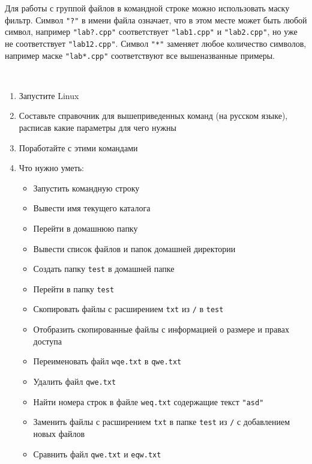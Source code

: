\documentclass[a4paper,12pt]{article}
\begin{document}
  \begin{flushleft}
    Для работы с группой файлов в командной строке можно использовать маску фильтр. Символ \texttt{"?"} в имени файла означает, что в этом месте может быть любой символ, например \texttt{"lab?.cpp"} соответствует \texttt{"lab1.cpp"} и \texttt{"lab2.cpp"}, но уже не соответствует \texttt{"lab12.cpp"}. Символ \texttt{"*"} заменяет любое количество символов, например маске \texttt{"lab*.cpp"} соответствуют все вышеназванные примеры.
  \end{flushleft}

  \newpage

  \begin{flushleft}
     \\[0.5em]
    \begin{enumerate}
      \item Запустите Linux
      \item Составьте справочник для вышеприведенных команд (на русском языке), расписав какие параметры для чего нужны
      \item Поработайте с этими командами
      \item Что нужно уметь:
      \begin{itemize}
        \item Запустить командную строку
        \item Вывести имя текущего каталога
        \item Перейти в домашнюю папку
        \item Вывести список файлов и папок домашней директории
        \item Создать папку \texttt{test} в домашней папке
        \item Перейти в папку \texttt{test}
        \item Скопировать файлы с расширением \texttt{txt} из \texttt{/} в \texttt{test}
        \item Отобразить скопированные файлы с информацией о размере и правах доступа
        \item Переименовать файл \texttt{wqe.txt} в \texttt{qwe.txt}
        \item Удалить файл \texttt{qwe.txt}
        \item Найти номера строк в файле \texttt{weq.txt} содержащие текст \texttt{"asd"}
        \item Заменить файлы с расширением \texttt{txt} в папке \texttt{test} из \texttt{/} с добавлением новых файлов
        \item Сравнить файл \texttt{qwe.txt} и \texttt{eqw.txt}

\end{itemize}
\end{enumerate}
\end{flushleft}
\end{document}
